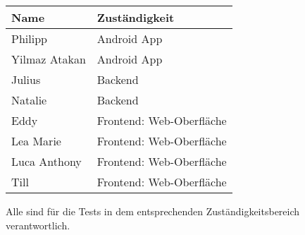 \begin{tabular}{ll}
 \rowcolor[HTML]{E7E7E7} 
 \textbf{Name} & \textbf{Zuständigkeit} \\ \hline
 Philipp &  Android App \\ 
 Yilmaz Atakan & Android App \\
 
  \rowcolor[HTML]{E7E7E7} 
  Julius & Backend \\  
   \rowcolor[HTML]{E7E7E7} 
 Natalie & Backend \\
 
 Eddy & Frontend: Web-Oberfläche \\  
 Lea Marie & Frontend: Web-Oberfläche \\ 
 Luca Anthony & Frontend: Web-Oberfläche \\ 
 Till & Frontend: Web-Oberfläche \\ 
\end{tabular}

\bigskip

Alle sind für die Tests in dem entsprechenden Zuständigkeitsbereich verantwortlich.


